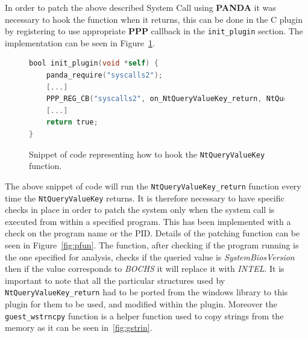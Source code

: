 In order to patch the above described System Call using \textbf{PANDA} it was necessary to hook the function when it returns, this can be done in the C plugin by registering to use appropriate \textbf{PPP} callback in the \lstinline{init_plugin} section. The implementation can be seen in Figure~\ref{fig:pinit}.

\begin{figure}[htp]
\centering
\begin{lstlisting}[language=C]
bool init_plugin(void *self) {
    panda_require("syscalls2");
    [...]
    PPP_REG_CB("syscalls2", on_NtQueryValueKey_return, NtQueryValueKey_return);
    [...]
    return true;
}
\end{lstlisting}
\caption{Snippet of code representing how to hook the \lstinline{NtQueryValueKey} function.}
\label{fig:pinit}
\end{figure} 

The above snippet of code will run the \lstinline{NtQueryValueKey_return} function every time the \lstinline{NtQueryValueKey} returns. It is therefore necessary to have specific checks in place in order to patch the system only when the system call is executed from within a specified program. This has been implemented with a check on the program name or the PID. Details of the patching function can be seen in Figure~\ref{fig:pfun}. The function, after checking if the program running is the one specified for analysis, checks if the queried value is \textit{SystemBiosVersion} then if the value corresponds to \textit{BOCHS} it will replace it with \textit{INTEL}. It is important to note that all the particular structures used by \lstinline{NtQueryValueKey_return} had to be ported from the windows library to this plugin for them to be used, and modified within the plugin. Moreover the \lstinline{guest_wstrncpy} function is a helper function used to copy strings from the memory as it can be seen in~\ref{fig:gstrin}.

